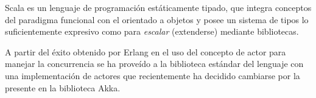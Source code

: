 
Scala es un lenguaje de programación estáticamente tipado, que integra conceptos del paradigma funcional con el orientado a objetos y posee un sistema de tipos lo suficientemente expresivo como para {\em escalar} (extenderse) mediante bibliotecas.

A partir del éxito obtenido por Erlang en el uso del concepto de actor para manejar la concurrencia se ha proveído a la biblioteca estándar del lenguaje con una implementación de actores que recientemente ha decidido cambiarse por la presente en la biblioteca Akka.

